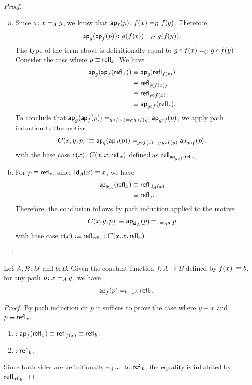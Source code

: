 \begin{proof}
\begin{enumerate}[a)]
        \item Since $p\colon x\eq Ay$, we know that $\fun{ap}_f(p)\colon f(x)\eq Bf(y)$. Therefore,
        \[
            \fun{ap}_g(\fun{ap}_f(p))\colon g(f(x))\eq Cg(f(y)).
        \]
        The type of the term above is definitionally equal to $g\circ f(x)\mathrel{=_{C}} g\circ f(y)$.
        Consider the case where $p\equiv\mathsf{refl}_x$. We have
        \begin{align*}
            \mathsf{ap}_g(\mathsf{ap}_f(\mathsf{refl}_x))
                &\equiv \mathsf{ap}_g(\mathsf{refl}_{f(x)})\\
                &\equiv \mathsf{refl}_{g(f(x))}\\
                &\equiv \mathsf{refl}_{g\circ f(x)}\\
                &\equiv \mathsf{ap}_{g\circ f}(\mathsf{refl}_x).
        \end{align*}
        To conclude that $\mathsf{ap}_g(\mathsf{ap}_f(p))\mathrel{=_{g\circ f(x)\mathrel{=_{C}}g\circ f(y)}}\mathsf{ap}_{g\circ f}(p)$, we apply path induction to the motive
        \[
            C(x,y,p)\mathrel{\vcentcolon}\equiv \mathsf{ap}_g(\mathsf{ap}_f(p))\mathrel{=_{g\circ f(x)\mathrel{=_{C}}g\circ f(y)}}\mathsf{ap}_{g\circ f}(p),
        \]
        with the base case $c(x)\colon C(x,x,\fun{refl}_x)$ defined as $\mathsf{refl}_{\mathsf{ap}_{g\circ f}(\mathsf{refl}_x)}$.

        \item For\/ $p\equiv\mathsf{refl}_x$, since\/ $\mathsf{id}_A(x)\equiv x$, we have
        \begin{align*}
            \mathsf{ap}_{\mathsf{id}_A}(\mathsf{refl}_x)
                &\equiv \mathsf{refl}_{\mathsf{id}_A(x)}\\
                &\equiv \mathsf{refl}_x.
        \end{align*}
        Therefore, the conclusion follows by path induction applied to the motive
        \[
            C(x,y,p)\mathrel{\vcentcolon}\equiv\mathsf{ap}_{\mathsf{id}_A}(p)\mathrel{=_{x\mathrel{=_{A}}y}}p
        \]
        with base case\/ $c(x)\defeq\fun{refl}_{\fun{refl}_x}\colon C(x,x,\fun{refl}_x)$.
        
    \end{enumerate}
\end{proof}

\begin{lem}\label{lem:ap-const}
    Let\/ $A, B\colon\univ$ and\/ $b\colon B$. Given the constant function\/ $f\colon A\to B$ defined by\/ $f(x)\mathrel{\vcentcolon}\equiv b$, for any path\/ $p\colon x\eq A y$, we have
    \[
        \mathsf{ap}_f(p) \mathrel{=_{b\mathrel{=_{B}} b}} \mathsf{refl}_b.
    \]
\end{lem}

\begin{proof}
    By path induction on $p$ it suffices to prove the case where $y\equiv x$ and $p\equiv \mathsf{refl}_x$.
    \begin{enumerate}[-]
        \item \lhs: $\mathsf{ap}_f(\mathsf{refl}_x)\equiv\mathsf{refl}_{f(x)}\equiv \mathsf{refl}_b$.
        \item \rhs: $\mathsf{refl}_b$.
    \end{enumerate}
    Since both sides are definitionally equal to $\mathsf{refl}_b$, the equality is inhabited by $\mathsf{refl}_{\mathsf{refl}_b}$.
\end{proof}


